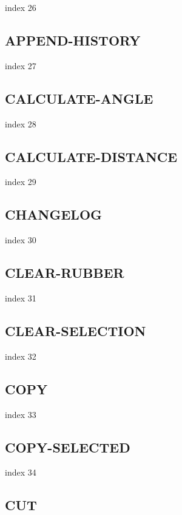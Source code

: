 \documentclass[11pt]{report}
\begin{document}
index 26

\subsection{APPEND-HISTORY}

index 27

\subsection{CALCULATE-ANGLE}

index 28

\subsection{CALCULATE-DISTANCE}

index 29

\subsection{CHANGELOG}

index 30

\subsection{CLEAR-RUBBER}

index 31

\subsection{CLEAR-SELECTION}

index 32

\subsection{COPY}

index 33

\subsection{COPY-SELECTED}

index 34

\subsection{CUT}
\end{document}
